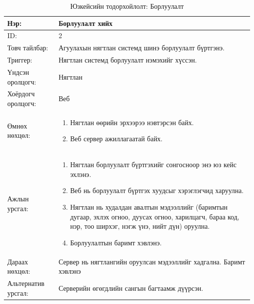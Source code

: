 \vspace*{1in}
\begin{center}
	\begin{table}[!htbp]
		\caption{Юзкейсийн тодорхойлолт: Борлуулалт}
		\begin{tabular}{|p{4cm}|p{10cm}|}
			\hline
			Нэр: & Борлуулалт хийх  \\
			\hline
			ID: & 2 \\
			\hline
			Товч тайлбар: & Агуулахын нягтлан системд шинэ борлуулалт бүртгэнэ.  \\
			\hline
			Триггер: & Нягтлан системд борлуулалт нэмэхийг хүссэн. \\
			\hline
			Үндсэн оролцогч: & Нягтлан \\
			\hline
			Хоёрдогч оролцогч: & Веб  \\
			\hline
			Өмнөх нөхцөл: &  \begin{enumerate}
				\item Нягтлан өөрийн эрхээрээ нэвтэрсэн байх.
				\item Веб сервер ажиллагаатай байх.
			\end{enumerate}
			\\			\hline
			Ажлын урсгал: & \begin{enumerate}
				\item Нягтлан борлуулалт бүртгэхийг  сонгосноор энэ юз кейс эхлэнэ.
				\item Веб нь борлуулалт бүртгэх хуудсыг хэрэглэгчид харуулна.
				\item Нягтлан нь худалдан авалтын мэдээллийг (баримтын дугаар, эхлэх огноо, дуусах огноо, харилцагч, бараа код, нэр, тоо ширхэг, нэгж үнэ, нийт дүн) оруулна. 
				\item Борлуулалтын баримт хэвлэнэ.
				
				
				
			\end{enumerate}
			\\						\hline
			Дараах нөхцөл: & Сервер нь нягтлангийн оруулсан мэдээллийг хадгална. 
			Баримт хэвлэнэ\\
			\hline
			Альтернатив урсгал: & Серверийн өгөгдлийн сангын багтаамж дүүрсэн. \\
			\hline
		\end{tabular}
	\end{table}
\end{center}
